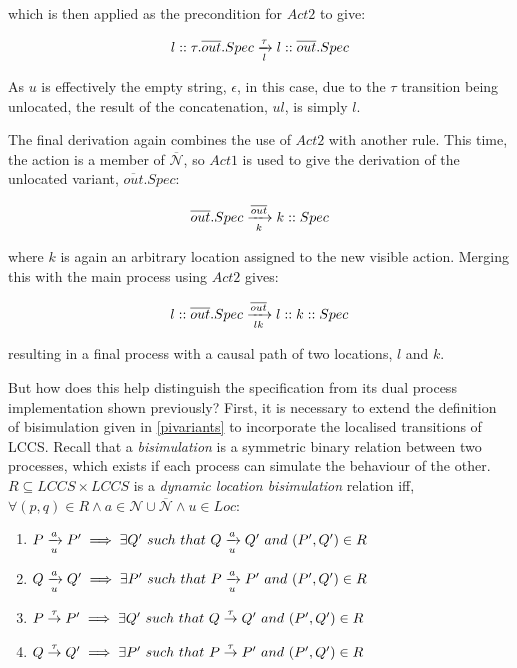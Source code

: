 \noindent which is then applied as the precondition for $Act2$ to give:

\begin{equation}
l::\tau.\overline{out}.Spec \xrightarrow[l]{\tau} l::\overline{out}.Spec
\end{equation}

\noindent As $u$ is effectively the empty string, $\epsilon$, in this
case, due to the $\tau$ transition being unlocated, the result of the
concatenation, $ul$, is simply $l$.

The final derivation again combines the use of $Act2$ with another rule.
This time, the action is a member of $\overline{\mathcal{N}}$, so $Act1$
is used to give the derivation of the unlocated variant,
$\overline{out}.Spec$:

\begin{equation}
\overline{out}.Spec \xrightarrow[k]{\overline{out}} k::Spec
\end{equation}

\noindent where $k$ is again an arbitrary location assigned to the new
visible action.  Merging this with the main process using $Act2$ gives:

\begin{equation}
l::\overline{out}.Spec \xrightarrow[lk]{\overline{out}} l::k::Spec
\end{equation}

\noindent resulting in a final process with a causal path of two
locations, $l$ and $k$.

But how does this help distinguish the specification from its dual
process implementation shown previously?  First, it is necessary to
extend the definition of bisimulation given in \ref{pivariants} to
incorporate the localised transitions of LCCS.  Recall that a
\emph{bisimulation} is a symmetric binary relation between two
processes, which exists if each process can simulate the behaviour of
the other.  $R \subseteq LCCS \times LCCS$ is a \emph{dynamic location
bisimulation} relation iff, $\forall (p,q) \in R \wedge a \in \mathcal{N}
\cup \overline{\mathcal{N}} \wedge u \in Loc$:

\begin{enumerate}
\item $P \xrightarrow[u]{a} P^\prime \implies \exists Q^\prime\ such\
  that\ Q \xrightarrow[u]{a} Q^\prime\ and\ (P^\prime,Q^\prime) \in R$
\item $Q \xrightarrow[u]{a} Q^\prime \implies \exists P^\prime\ such\
  that\ P \xrightarrow[u]{a} P^\prime\ and\ (P^\prime,Q^\prime) \in R$
\item $P \stackrel{\tau}{\rightarrow} P^\prime \implies \exists Q^\prime\ such\
  that\ Q \stackrel{\tau}{\rightarrow} Q^\prime\ and\ (P^\prime,Q^\prime) \in R$
\item $Q \stackrel{\tau}{\rightarrow} Q^\prime \implies \exists P^\prime\ such\
  that\ P \stackrel{\tau}{\rightarrow} P^\prime\ and\ (P^\prime,Q^\prime) \in R$
\end{enumerate}

